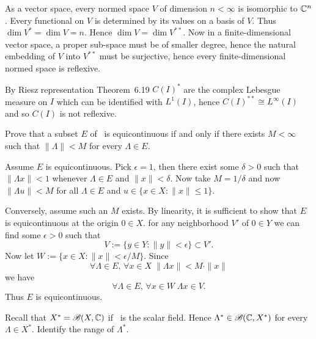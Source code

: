 \begin{enumerate}
As a vector space, every normed space $V$ of 
dimension \(n < \infty\) is isomorphic
to \(\mathbb{C}^n\). Every functional on $V$ is determined by its values 
on a basis of $V$. Thus \(\dim V^* = \dim V = n\).
Hence \(\dim V = \dim V^{**}\).
Now in a finite-dimensional vector space, a proper sub-space
must be of smaller degree, hence the natural embedding of $V$
into \(V^{**}\) must be surjective, hence every finite-dimensional normed
space is reflexive.

By Riesz representation \cite{RudinRCA80} Theorem~6.19
\(C(I)^*\) are the complex Lebesgue measure on $I$
which can be identified with \(L^1(I)\), hence \(C(I)^{**} \cong L^\infty(I)\)
and so \(C(I)\) is not reflexive.


\begin{excopy}
Prove that a subset $E$ of \BXY\ is equicontinuous if and only if there exists
\(M < \infty\)
such that \(\|\Lambda\| < M\) for every \(\Lambda \in E\).
\end{excopy}

Assume $E$ is equicontinuous.
Pick \(\epsilon = 1\), then there exist some \(\delta > 0\)
such that \(\|\Lambda x \| < 1\) whenever \(\Lambda \in E\) 
and \(\|x\| < \delta\).
Now take \(M = 1/\delta\) and now \(\|\Lambda u\| < M\)
for all \(\Lambda \in E\) and \(u \in \{x\in X: \|x\| \leq 1\}\).

Conversely, assume such an $M$ exists.
By linearity, it is sufficient to show that 
$E$ is equicontinuous at the origin \(0 \in X\).
for any neighborhood $V'$ of \(0\in Y\)
we can find some \(\epsilon > 0\) such that 
\begin{equation*}
V := \{y \in Y: \|y\|< \epsilon\} \subset V'.
\end{equation*}
Now let 
\(W := \{x \in X: \|x\|< \epsilon/M\}\).
Since 
\begin{equation*}
\forall \Lambda \in E,\, \forall x\in X\; \|\Lambda x \| < M\cdot \|x\|
\end{equation*}
we have
\begin{equation*}
\forall \Lambda \in E,\, \forall x\in  W\; \Lambda x \in V.
\end{equation*}
Thus $E$ is equicontinuous.

\begin{excopy}
Recall that \(X^* = \mathscr{B}(X,\mathbb{C})\) if \C\ is the scalar field.
Hence \(\Lambda^* \in \mathscr{B}(\mathbb{C},X^*)\) for every
\(\Lambda \in X^*\). Identify the range of \(\Lambda^*\).
\end{excopy}


\end{enumerate}
